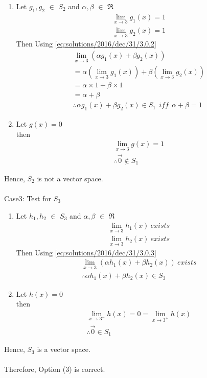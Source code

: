 \begin{enumerate}
\item Let $g_1,g_2$ $\in$ $S_2$ and $\alpha,\beta$ $\in$ $\Re$
\begin{equation}\label{eq:solutions/2016/dec/31/3.0.2}
\begin{split}
\lim_{x\to3} g_1(x) = 1\\
\lim_{x\to3} g_2(x) = 1
\end{split}
\end{equation}
Then Using \eqref{eq:solutions/2016/dec/31/3.0.2}
\begin{equation*}
\begin{split}
\lim_{x\to3} (\alpha g_1(x) + \beta g_2(x))\\
= \alpha \left(\lim_{x\to3} g_1(x)\right) + \beta \left(\lim_{x\to3} g_2(x)\right)\\
= \alpha \times 1 + \beta \times 1\\
= \alpha + \beta\\
 \therefore \alpha g_1(x) + \beta g_2(x) \in S_1 ~~iff~~  \alpha + \beta = 1
\end{split}
\end{equation*}
\item Let $g(x) = 0$\\
then 
\begin{equation*}
\begin{split}
\lim_{x\to3} g(x) = 1\\
\therefore \vec{0} \notin S_1
\end{split}
\end{equation*}
\end{enumerate}
Hence, $S_2$ is not a vector space.\\
\\
Case3: Test for $S_3$
\begin{enumerate}
\item Let $h_1,h_2$ $\in$ $S_3$ and $\alpha,\beta$ $\in$ $\Re$
\begin{equation} \label{eq:solutions/2016/dec/31/3.0.3}
\begin{split}
\lim_{x\to3} h_1(x) ~exists\\
\lim_{x\to3} h_2(x) ~exists
\end{split}
\end{equation}
Then Using \eqref{eq:solutions/2016/dec/31/3.0.3}
\begin{equation*}
\begin{split}
\lim_{x\to3} (\alpha h_1(x) + \beta h_2(x)) ~exists\\
 \therefore \alpha h_1(x) + \beta h_2(x) \in S_3
\end{split}
\end{equation*}
\item Let $h(x) = 0$\\
then 
\begin{equation*}
\begin{split}
\lim_{x\to3^-} h(x) = 0 = \lim_{x\to3^+} h(x)\\
\therefore \vec{0} \in S_1
\end{split}
\end{equation*}
\end{enumerate}
Hence, $S_3$ is a vector space.\\
\\
Therefore, Option (3) is correct.
